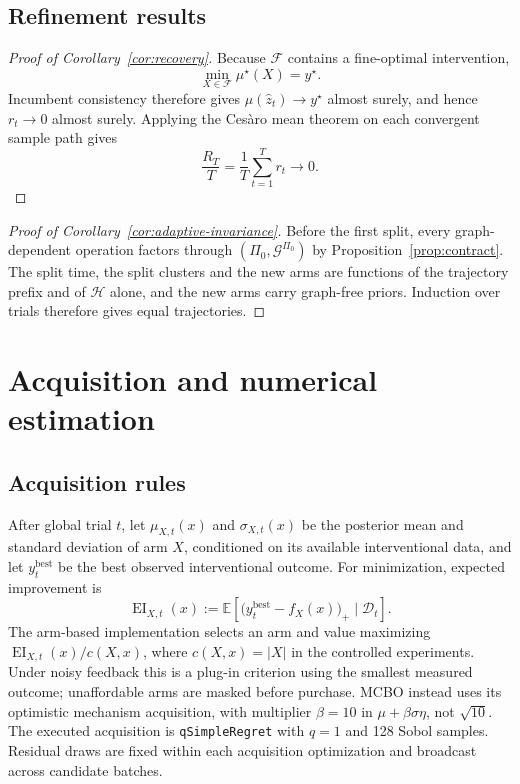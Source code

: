 \documentclass[twoside]{article}
\newcommand{\E}{\mathbb{E}}
\newcommand{\Gg}{\mathcal{G}}
\begin{document}
\subsection{Refinement results}
\begin{proof}[Proof of Corollary~\ref{cor:recovery}]
Because \(\mathcal F\) contains a fine-optimal intervention,
\[
\min_{X\in\mathcal F}\mu^\star(X)=y^\star.
\]
Incumbent consistency therefore gives
\(\mu(\hat z_t)\to y^\star\) almost surely, and hence \(r_t\to0\)
almost surely. Applying the Cesàro mean theorem on each convergent
sample path gives
\[
\frac{R_T}{T}
=\frac1T\sum_{t=1}^{T}r_t\longrightarrow0.
\]
\end{proof}

\begin{proof}[Proof of Corollary~\ref{cor:adaptive-invariance}]
Before the first split, every graph-dependent operation factors through $(\Pi_0,\Gg^{\Pi_0})$ by Proposition~\ref{prop:contract}. The split time, the split clusters and the new arms are functions of the trajectory prefix and of $\mathcal H$ alone, and the new arms carry graph-free priors. Induction over trials therefore gives equal trajectories.
\end{proof}

\section{Acquisition and numerical estimation}
\label{app:estimators}

\subsection{Acquisition rules}

After global trial $t$, let $\mu_{X,t}(x)$ and $\sigma_{X,t}(x)$ be the posterior mean and standard deviation of arm $X$, conditioned on its available interventional data, and let $y_t^{\mathrm{best}}$ be the best observed interventional outcome. For minimization, expected improvement is
\[
 \operatorname{EI}_{X,t}(x)
 :=\E\!\left[
 \bigl(y_t^{\mathrm{best}}-f_X(x)\bigr)_+
 \mid\mathcal D_t\right].
\]
The arm-based implementation selects an arm and value maximizing $\operatorname{EI}_{X,t}(x)/c(X,x)$, where $c(X,x)=|X|$ in the controlled experiments. Under noisy feedback this is a plug-in criterion using the smallest measured outcome; unaffordable arms are masked before purchase. MCBO instead uses its optimistic mechanism acquisition, with multiplier $\beta=10$ in $\mu+\beta\sigma\eta$, not $\sqrt{10}$. The executed acquisition is \texttt{qSimpleRegret} with $q=1$ and 128 Sobol samples. Residual draws are fixed within each acquisition optimization and broadcast across candidate batches.
\end{document}
